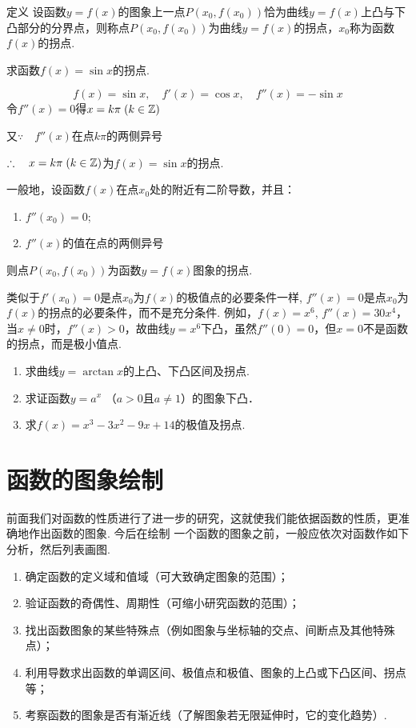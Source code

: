 \begin{thm}
    {定义} 设函数$y=f(x)$的图象上一点$P(x_0,f(x_0))$恰为曲线$y=f(x)$上凸与下凸部分的分界点，则称点$P(x_0, f(x_0))$为曲线$y=f(x)$的拐点，$x_0$称为函数$f(x)$的拐点.
\end{thm}



\begin{example}
    求函数$f(x)=\sin x$的拐点.
\end{example}

\begin{solution}
    \[f(x)=\sin x,\quad f'(x)=\cos x,\quad f''(x)=-\sin x\]
令$f''(x)=0$得$x=k\pi\; (k\in\mathbb{Z})$

又$\because\quad f''(x)$在点$k\pi$的两侧异号

$\therefore\quad x=k\pi\; (k\in\mathbb{Z})$为$f(x)=\sin x$的拐点.
\end{solution}

一般地，设函数$f(x)$在点$x_0$处的附近有二阶导数，并且：
\begin{enumerate}[(1)]
\item $f''(x_0)=0$;
\item $f''(x)$的值在点的两侧异号
\end{enumerate}
则点$P(x_0,f(x_0))$为函数$y=f(x)$图象的拐点.

类似于$f'(x_0)=0$是点$x_0$为$f(x)$的极值点的必要条件一样, $f''(x)=0$是点$x_0$为$f(x)$的拐点的必要条件，而不是充分条件. 例如，$f(x)=x^6$, $f''(x)=30x^4$，当$x\ne 0$时，$f''(x)>0$，故曲线$y=x^6$下凸，虽然$f''(0)=0$，但$x=0$不是函数的拐点，而是极小值点.

\begin{ex}
\begin{enumerate}
    \item 求曲线$y=\arctan x$的上凸、下凸区间及拐点.
    \item 求证函数$y=a^x$ （$a>0$且$a\ne 1$）的图象下凸．
    \item 求$f(x)=x^3-3x^2-9x+14$的极值及拐点.
\end{enumerate}
\end{ex}

\section{函数的图象绘制}
前面我们对函数的性质进行了进一步的研究，这就使我们能依据函数的性质，更准确地作出函数的图象. 今后在绘制
一个函数的图象之前，一般应依次对函数作如下分析，然后列表画图.
\begin{enumerate}
\item 确定函数的定义域和值域（可大致确定图象的范围）；
\item 验证函数的奇偶性、周期性（可缩小研究函数的范围）；
\item 找出函数图象的某些特殊点（例如图象与坐标轴的交点、间断点及其他特殊点）；
\item 利用导数求出函数的单调区间、极值点和极值、图象的上凸或下凸区间、拐点等；
\item 考察函数的图象是否有渐近线（了解图象若无限延伸时，它的变化趋势）.
\end{enumerate}





